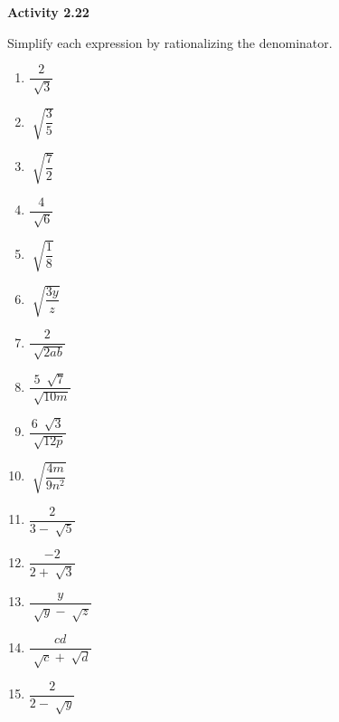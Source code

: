 \vspace{1ex}
\noindent\textbf{Activity 2.22}

\vspace{0.75ex}

Simplify each expression by rationalizing the denominator.

\begin{multicols}{3}
\begin{enumerate}[noitemsep, label = \color{blue}\arabic*. ]
\item \( \dfrac{2}{\sqrt[]{3}} \)
\item \( \sqrt[]{\dfrac{3}{5}} \)
\item \( \sqrt[]{\dfrac{7}{2}} \)
\item \( \dfrac{4}{\sqrt[]{6}} \)
\item \( \sqrt[]{\dfrac{1}{8}} \)
\item \( \sqrt[]{\dfrac{3y}{z}} \)
\item \( \dfrac{2}{\sqrt[]{2ab}} \)
\item \( \dfrac{5~ \sqrt[]{7}}{\sqrt[]{10m}} \)
\item \( \dfrac{6~ \sqrt[]{3}}{\sqrt[]{12p}} \)
\item \( \sqrt[]{\dfrac{4m}{9 n^{2}}} \)
\item \( \dfrac{2}{3- \sqrt[]{5}} \)
\item \( \dfrac{-2}{2 + \sqrt[]{3}} \)
\item \( \dfrac{y}{\sqrt[]{y} - \sqrt[]{z}} \)
\item \( \dfrac{cd}{\sqrt[]{c} + \sqrt[]{d}} \)
\item \( \dfrac{2}{2 - \sqrt[]{y}} \)  
\end{enumerate}
\end{multicols}

